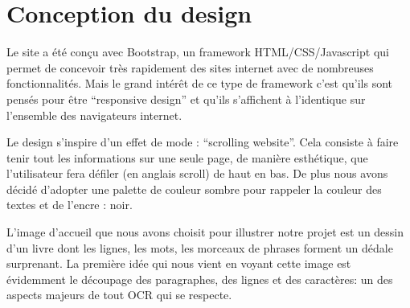 \documentclass[11pt]{report}
\begin{document}
\section{Conception du design}

Le site a été conçu avec Bootstrap, un framework HTML/CSS/Javascript qui permet de concevoir très rapidement des sites internet avec de nombreuses fonctionnalités. Mais le grand intérêt de ce type de framework c’est qu’ils sont pensés pour être “responsive design” et qu’ils s’affichent à l’identique sur l’ensemble des navigateurs internet.

Le design s'inspire d'un effet de mode : ``scrolling website''. Cela consiste à faire tenir tout les informations sur une seule page, de manière esthétique, que l'utilisateur fera défiler (en anglais scroll) de haut en bas. De plus nous avons décidé d'adopter une palette de couleur sombre pour rappeler la couleur des textes et de l'encre : noir.

L'image d'accueil que nous avons choisit pour illustrer notre projet est un dessin d'un livre dont les lignes, les mots, les morceaux de phrases forment un dédale surprenant. La première idée qui nous vient en voyant cette image est évidemment le découpage des paragraphes, des lignes et des caractères: un des aspects majeurs de tout OCR qui se respecte.
\end{document}
